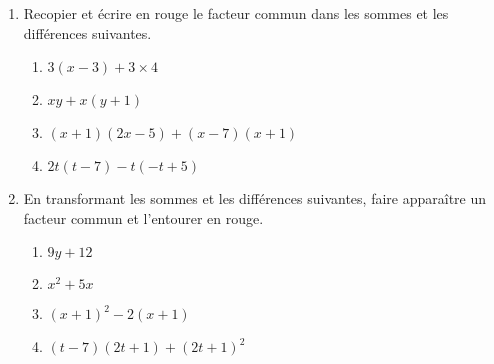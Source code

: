 \begin{exercice*}
    \begin{enumerate}
        \item Recopier et écrire en rouge le facteur commun dans les sommes et les différences suivantes.
        \begin{enumerate}
            \item $3(x-3)+3\times 4$
            \item $xy+x(y+1)$
            \item $(x+1)(2x-5)+(x-7)(x+1)$
            \item $2t(t-7)-t(-t+5)$
        \end{enumerate}
        \item En transformant les sommes et les différences suivantes, faire apparaître un facteur commun et l'entourer en rouge.
        \begin{enumerate}
            \item $9y+12$
            \item $x^2+5x$
            \item $(x+1)^2-2(x+1)$
            \item $(t-7)(2t+1)+(2t+1)^2$
        \end{enumerate}
    \end{enumerate}
\end{exercice*}
